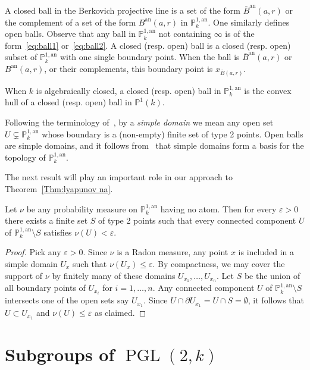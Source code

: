 \documentclass[AHL,Unicode,longabstracts]{cedram}
\DeclareMathOperator{\PGL}{PGL}
\newcommand{\an}{\mathrm{an}}
\newcommand{\e}{\varepsilon}
\newcommand{\PP}{\mathbb{P}}
\newcommand{\berk}{{\mathbb{P}^{1, \mathrm{an}}_k}}
\newcommand{\PGLk}{\PGL(2, k)}
\begin{document}
A closed ball in the Berkovich projective line is a set of the form $\bar B^\an(a, r)$ or the complement of a set of the form $B^\an(a, r) $ in $\PP^{1, \an}_k$. One similarly defines open balls. Observe that any ball in $\PP^{1, \an}_k$ not containing $\infty$ is of the form~\eqref{eq:ball1} or~\eqref{eq:ball2}. A closed (resp. open) ball is a closed (resp. open) subset of $\PP^{1, \an}_k$ with one single boundary point. When the ball is $\bar B^\an(a, r) $ or $B^\an(a, r)$, or their complements, this boundary point is $x_{\bar{B}(a,r)}$.

When $k$ is algebraically closed, a closed (resp. open) ball in $\PP^{1, \an}_k$ is the convex hull of a closed (resp. open) ball in $\PP^1(k)$.


Following the terminology of~\cite{baker-rumely}, by a \emph{simple domain} we mean any open set $U\subsetneq \berk$ whose boundary is a (non-empty) finite set of type 2 points. Open balls are simple domains, and it follows from~\cite[Thm.~4.2.1]{berko} that simple domains form a basis for the topology of $\berk$.

The next result will play an important role in our approach to Theorem~\ref{Thm:lyapunov na}.

\begin{prop}\label{prop:subtree Hk}
Let $\nu$ be any probability measure on $\berk$ having no atom. Then for every $\e>0$ there exists a finite set $S$ of type 2 points such that every connected component $U$ of $\berk\setminus S$ satisfies $\nu(U)<\e$.
\end{prop}

\begin{proof}
Pick any $\e>0$. Since $\nu$ is a Radon measure, any point $x$ is included in a simple domain $U_x$ such that $\nu(U_x) \le \e$. By compactness, we may cover the support of $\nu$ by finitely many of these domains $U_{x_1}, \ldots, U_{x_n}$. Let $S$ be the union of all boundary points of $U_{x_i}$ for $i =1, \ldots,n$. Any connected component $U$ of $\berk\setminus S$ intersects one of the open sets say $U_{x_1}$. Since $U \cap \partial U_{x_1} = U\cap S = \emptyset$, it follows that $U\subset U_{x_1}$ and $\nu(U) \le \e$ as claimed.
\end{proof}


\section{Subgroups of \texorpdfstring{$\PGLk$}{PGLk}}\label{sec:subgroups}
\end{document}
